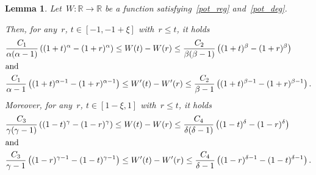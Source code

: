 \documentclass[10pt,a4paper]{amsart}
\newtheorem{lemma}[theorem]{Lemma}
\numberwithin{equation}{section}
\newcommand{\R}{\mathbb{R}}
\begin{document}
   \begin{lemma}\label{thc_deg}
Let~$W:\R \to\R$ be a function satisfying~\eqref{pot_reg} and~\eqref{pot_deg}.

Then, for any~$r$, $t \in [-1,-1+\xi]$ with~$r\leq t$, it holds
\begin{equation}\label{5968hht}
\begin{split}
&\displaystyle\frac{C_1}{\alpha(\alpha-1)}\left((1+t)^{\alpha}-(1+r)^{\alpha}\right) \leq W(t)-W(r) \leq \frac{C_2}{\beta(\beta-1)}\left((1+t)^{\beta}-(1+r)^{\beta}\right) \\ &\mbox{and}\\
&\displaystyle\frac{C_1}{\alpha-1} \left( (1+t)^{\alpha-1} - (1+r)^{\alpha-1}\right) \leq W\rq{}(t) - W\rq{}(r) \leq \frac{C_2}{\beta-1} \left((1+t)^{\beta-1}-(1+r)^{\beta-1}\right).
\end{split}
\end{equation}
Moreover, for any~$r$, $t \in [1-\xi,1]$ with~$r\leq t$, it holds
\begin{equation}\label{eoi3j59}
\begin{split}
&  \displaystyle\frac{C_3}{\gamma(\gamma-1)} \left((1-t)^{\gamma}-(1-r)^{\gamma}\right)\leq W(t) - W(r) \leq \displaystyle\frac{C_4}{\delta(\delta-1)} \left( (1-t)^{\delta} - (1-r)^{\delta}\right) \\& \mbox{and} \\
&\displaystyle\frac{C_3}{\gamma-1} \left( (1-r)^{\gamma-1} - (1-t)^{\gamma-1}\right) \leq W\rq{}(t) - W\rq{}(r) \leq \frac{C_4}{\delta-1} \left((1-r)^{\delta-1}-(1-t)^{\delta-1}\right).
\end{split}
\end{equation}
\end{lemma}  
   
\end{document}

